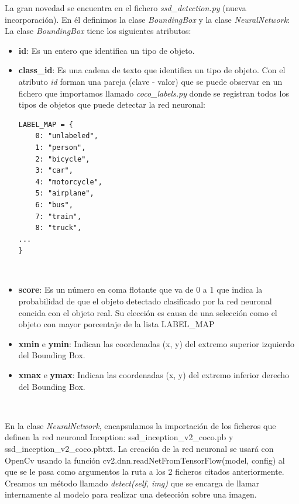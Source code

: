 La gran novedad se encuentra en el fichero \textit{ssd\_detection.py} (nueva incorporación). En él definimos la clase \textit{BoundingBox} y la clase \textit{NeuralNetwork}:\\

La clase \textit{BoundingBox} tiene los siguientes atributos:
\begin{itemize}
	\item \textbf{id}: Es un entero que identifica un tipo de objeto.
	\item \textbf{class\_id}: Es una cadena de texto que identifica un tipo de objeto. Con el atributo \textit{id} forman una pareja (clave - valor) que se puede observar en un fichero que importamos llamado \textit{coco\_labels.py} donde se registran todos los tipos de objetos que puede detectar la red neuronal:\\
\begin{lstlisting}
LABEL_MAP = {
    0: "unlabeled",
    1: "person",
    2: "bicycle",
    3: "car",
    4: "motorcycle",
    5: "airplane",
    6: "bus",
    7: "train",
    8: "truck",
...
}
\end{lstlisting}\
	\item \textbf{score}: Es un número en coma flotante que va de 0 a 1 que indica la probabilidad de que el objeto detectado clasificado por la red neuronal concida con el objeto real. Su elección es causa de una selección como el objeto con mayor porcentaje de la lista LABEL\_MAP
	\item \textbf{xmin} e \textbf{ymin}: Indican las coordenadas (x, y) del extremo superior izquierdo del Bounding Box.
	\item \textbf{xmax} e \textbf{ymax}: Indican las coordenadas (x, y) del extremo inferior derecho del Bounding Box.
\end{itemize}\

En la clase \textit{NeuralNetwork}, encapsulamos la importación de los ficheros que definen la red neuronal Inception: ssd\_inception\_v2\_coco.pb y ssd\_inception\_v2\_coco.pbtxt. La creación de la red neuronal se usará con OpenCv usando la función cv2.dnn.readNetFromTensorFlow(model, config) al que se le pasa como argumentos la ruta a los 2 ficheros citados anteriormente. Creamos un método llamado \textit{detect(self, img)} que se encarga de llamar internamente al modelo para realizar una detección sobre una imagen.\\

